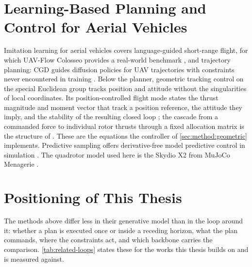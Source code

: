 \section{Learning-Based Planning and Control for Aerial Vehicles}\label{sec:rel:aerial}

Imitation learning for aerial vehicles covers language-guided short-range flight, for which UAV-Flow
Colosseo provides a real-world benchmark \parencite{wang2025uavflow}, and trajectory planning: CGD
guides diffusion policies for \ac{UAV} trajectories with constraints never encountered in training
\parencite{kondo2024cgd}. Below the planner, geometric tracking control on the special Euclidean group
tracks position and attitude without the singularities of local coordinates. Its
position-controlled flight mode states the thrust magnitude and moment vector that track a position
reference, the attitude they imply, and the stability of the resulting closed loop
\parencite[Eqs.~(19)--(23), Prop.~3]{lee2010geometric}; the cascade from a commanded force to
individual rotor thrusts through a fixed allocation matrix is the structure of
\parencite{mellinger2011minimum}. These are the equations the controller of
\autoref{sec:method:geometric} implements. Predictive sampling offers derivative-free model
predictive control in simulation \parencite{howell2022predictive}. The quadrotor model used here is the Skydio X2 from MuJoCo
Menagerie \parencite{zakka2022menagerie}.

\section{Positioning of This Thesis}\label{sec:rel:positioning}

The methods above differ less in their generative model than in the loop around it: whether a plan is
executed once or inside a receding horizon, what the plan commands, where the constraints act, and
which backbone carries the comparison. \autoref{tab:related-loops} states these for the works this
thesis builds on and is measured against.

